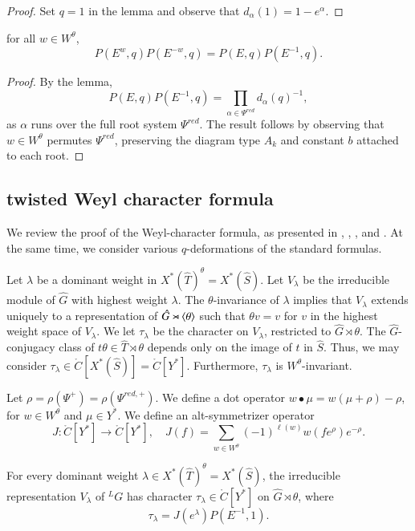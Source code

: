 \begin{proof}  
Set $q=1$ in the lemma and observe that $d_\alpha(1)=1-e^\alpha$.
\end{proof}

\begin{corollary}\label{cor:weyl-p}  
for all $w\in W^\theta$,
\[
P(E^w,q) P(E^{-w},q) = P(E,q)P(E^{-1},q).
\]
\end{corollary}

\begin{proof} 
By the lemma,
\[
P(E,q)P(E^{-1},q) = \prod_{\alpha\in \Psi^{red}} d_{\alpha}(q)^{-1},
\]
as $\alpha$ runs over the full root system $\Psi^{red}$.  The result
follows by observing that $w\in W^\theta$ permutes $\Psi^{red}$,
preserving the diagram type $A_k$ and constant $b$ attached to each
root.
\end{proof}

\subsection{twisted Weyl character formula}\label{sec:weyl-char}

We review the proof of the Weyl-character formula, as presented in
\cite{kostant1961lie}, \cite{jantzen1977darstellungen},
\cite{wendt2001weyl}, and \cite{kumar2009characters}.  At the same
time, we consider various $q$-deformations of the standard formulas.

Let $\lambda$ be a dominant weight in $X^*(\hat T)^\theta = X^*(\hat
S)$.  Let $V_\lambda$ be the irreducible module of $\hat G$ with
highest weight $\lambda$.  The $\theta$-invariance of $\lambda$
implies that $V_\lambda$ extends uniquely to a representation of $\hat
G \rtimes \langle{\theta}\rangle$ such that $\theta v = v$ for $v$ in the
highest weight space of $V_\lambda$.  We let $\tau_\lambda$ be the
character on $V_\lambda$, restricted to $\hat G\rtimes\theta$.   The
$\hat G$-conjugacy class of $t\theta\in \hat T\rtimes\theta$ depends
only on the image of $t$ in $\hat S$.  Thus, we may consider
$\tau_\lambda\in \ring{C}[X^*(\hat S)] =\ring{C}[Y^*]$.  Furthermore,
$\tau_\lambda$ is $W^\theta$-invariant.

Let $\rho = \rho(\Psi^+) = \rho(\Psi^{red,+})$.  We define a dot
operator $w\bullet \mu = w(\mu+\rho)-\rho$, for $w\in W^\theta$ and
$\mu\in Y^*$.  We define an alt-symmetrizer operator
\[
J:\ring{C}[Y^*]\to \ring{C}[Y^*],
\quad J(f) = \sum_{w\in W^\theta} (-1)^{\ell(w)} w(f e^\rho) e^{-\rho}.
\]

\begin{theorem}  
  For every dominant weight $\lambda\in X^*(\hat T)^\theta = X^*(\hat
  S)$,  the irreducible representation $V_\lambda$ of ${}^LG$ has
  character $\tau_\lambda\in \ring{C}[Y^*]$ on $\hat G\rtimes \theta$,
  where
\[
\tau_\lambda = J(e^\lambda) P(E^{-1},1).
\]
\end{theorem}


